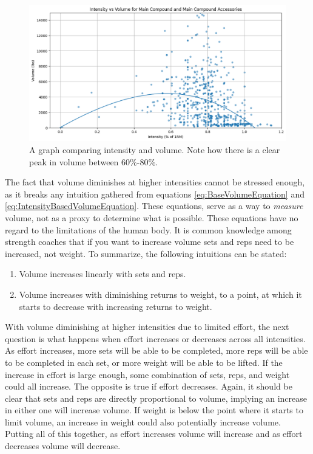 \begin{figure}
    \centering
    \includegraphics[scale=0.55]{images/ch3/IntensityVsVolume.png}
    \caption{A graph comparing intensity and volume. Note how there is a clear peak in volume between $60\%$-$80\%$.} 
    \label{fig:IntensityVsVolumeGraph}
\end{figure}

The fact that volume diminishes at higher intensities cannot be stressed enough, as it breaks any intuition gathered from equations \ref{eq:BaseVolumeEquation} and \ref{eq:IntensityBasedVolumeEquation}. These equations, serve as a way to \textit{measure} volume, not as a proxy to determine what is possible. These equations have no regard to the limitations of the human body. It is common knowledge among strength coaches that if you want to increase volume sets and reps need to be increased, not weight. To summarize, the following intuitions can be stated:

\begin{enumerate}
	\item Volume increases linearly with sets and reps.
	\item Volume increases with diminishing returns to weight, to a point, at which it starts to decrease with increasing returns to weight.
\end{enumerate}

With volume diminishing at higher intensities due to limited effort, the next question is what happens when effort increases or decreases across all intensities. As effort increases, more sets will be able to be completed, more reps will be able to be completed in each set, or more weight will be able to be lifted. If the increase in effort is large enough, some combination of sets, reps, and weight could all increase. The opposite is true if effort decreases. Again, it should be clear that sets and reps are directly proportional to volume, implying an increase in either one will increase volume. If weight is below the point where it starts to limit volume, an increase in weight could also potentially increase volume. Putting all of this together, as effort increases volume will increase and as effort decreases volume will decrease.

